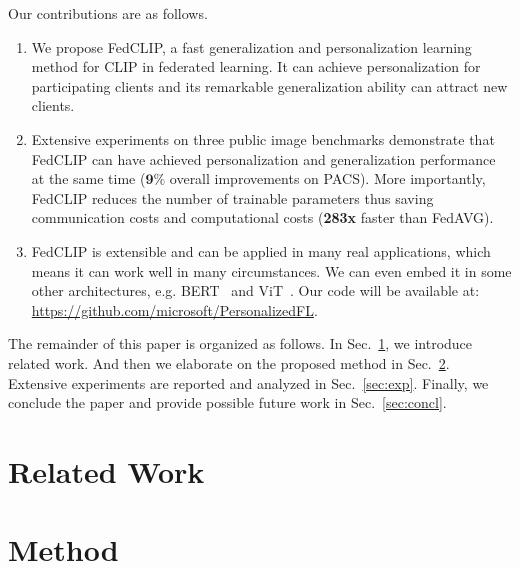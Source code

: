\documentclass[11pt]{article}
\newcommand{\sectionname}{Sec.}
\newcommand{\method}{FedCLIP\xspace}
\newcommand{\wjdd}[1]{\todo[linecolor=cyan,backgroundcolor=cyan!25,bordercolor=cyan,size=\scriptsize]{(WJD): #1}}
\newcommand{\wjd}[1]{{\color{cyan}{[(WJD): #1]}}}
\begin{document}
Our contributions are as follows.
\begin{enumerate}
    \item We propose \method, a fast generalization and personalization learning method for CLIP in federated learning. It can achieve personalization for participating clients and its remarkable generalization ability can attract new clients.
    \item Extensive experiments on three public image benchmarks demonstrate that \method can have achieved personalization and generalization performance at the same time ($\textbf{9}\%$ overall improvements on PACS). More importantly, \method reduces the number of trainable parameters thus saving communication costs and computational costs (\textbf{283x} faster than FedAVG).%
    \item \method is extensible and can be applied in many real applications, which means it can work well in many circumstances. We can even embed it in some other architectures, e.g. BERT~\cite{tenney2019bert} and ViT~\cite{han2022survey}.
    Our code will be available at: \url{https://github.com/microsoft/PersonalizedFL}.
\end{enumerate}

The remainder of this paper is organized as follows.
In \sectionname~\ref{sec:relw}, we introduce related work.
And then we elaborate on the proposed method in \sectionname~\ref{sec:method}.
Extensive experiments are reported and analyzed in \sectionname~\ref{sec:exp}.
Finally, we conclude the paper and provide possible future work in \sectionname~\ref{sec:concl}.

\section{Related Work}
\label{sec:relw}


\section{Method}
\label{sec:method}
\end{document}

